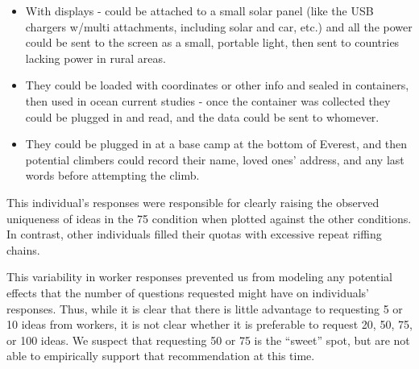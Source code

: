 \begin{itemize}
\item With displays - could be attached to a small solar panel (like the USB chargers w/multi attachments, including solar and car, etc.) and all the power could be sent to the screen as a small, portable light, then sent to countries lacking power in rural areas.
\item They could be loaded with coordinates or other info and sealed in containers, then used in ocean current studies - once the container was collected they could be plugged in and read, and the data could be sent to whomever.
\item They could be plugged in at a base camp at the bottom of Everest, and then potential climbers could record their name, loved ones' address, and any last words before attempting the climb. 
\end{itemize}

This individual's responses were responsible for clearly raising the observed uniqueness of ideas in the 75 condition when plotted against the other conditions.
In contrast, other individuals filled their quotas with excessive repeat riffing chains. 

This variability in worker responses prevented us from modeling any potential effects that the number of questions requested might have on individuals' responses. Thus, while it is clear that there is little advantage to requesting 5 or 10 ideas from workers, it is not clear whether it is preferable to request 20, 50, 75, or 100 ideas. We suspect that requesting 50 or 75 is the ``sweet'' spot, but are not able to empirically support that recommendation at this time.


